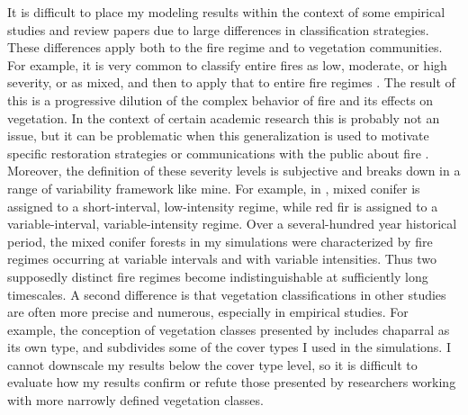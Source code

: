 It is difficult to place my modeling results within the context of some empirical studies and review papers due to large differences in classification strategies. These differences apply both to the fire regime and to vegetation communities. For example, it is very common to classify entire fires as low, moderate, or high severity, or as mixed, and then to apply that to entire fire regimes \citep{Chang1995,Beaty2008,Collins2010,Kane2013}. The result of this is a progressive dilution of the complex behavior of fire and its effects on vegetation. In the context of certain academic research this is probably not an issue, but it can be problematic when this generalization is used to motivate specific restoration strategies or communications with the public about fire \citep{Little2008,Sanjayan2012}. Moreover, the definition of these severity levels is subjective and breaks down in a range of variability framework like mine. For example, in \citet{Chang1995}, mixed conifer is assigned to a short-interval, low-intensity regime, while red fir is assigned to a variable-interval, variable-intensity regime. Over a several-hundred year historical period, the mixed conifer forests in my simulations were characterized by fire regimes occurring at variable intervals and with variable intensities. Thus two supposedly distinct fire regimes become indistinguishable at sufficiently long timescales.
%
A second difference is that vegetation classifications in other studies are often more precise and numerous, especially in empirical studies. For example, the conception of vegetation classes presented by \citet{Skinner1996} includes chaparral as its own type, and subdivides some of the cover types I used in the simulations. I cannot downscale my results below the cover type level, so it is difficult to evaluate how my results confirm or refute those presented by researchers working with more narrowly defined vegetation classes.

